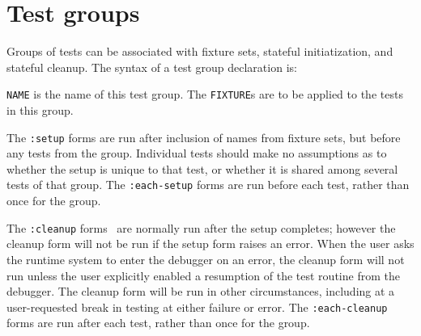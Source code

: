 
\section{Test groups}
\label{sec:groups}
Groups of tests can be
associated with fixture sets, stateful initiatization, and stateful
cleanup.  The syntax of a test group declaration
is:

%
\texttt{NAME} is the name of this test group.  The \texttt{FIXTURE}s
are to be applied to the tests in this group.

The \texttt{:setup} forms are run after
inclusion of names from fixture sets, but before any tests from the
group.  Individual tests should make no assumptions as to whether the
setup is unique to that test, or whether it is shared among several
tests of that group.  The \texttt{:each-setup} forms are run before
each test, rather than once for the group.

The \texttt{:cleanup} forms~ are
normally run after the setup completes; however the cleanup form will
not be run if the setup form raises an error.  When the user asks the
runtime system to enter the debugger on an error, the cleanup form
will not run unless the user explicitly enabled a resumption of the
test routine from the debugger.  The cleanup form will be run in other
circumstances, including at a user-requested break in testing at
either failure or error.  The \texttt{:each-cleanup} forms are run
after each test, rather than once for the group.

